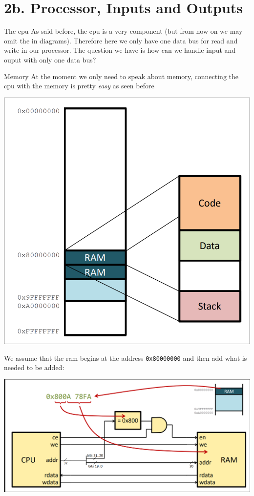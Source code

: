 \section{2b. Processor, Inputs and Outputs}

\begin{parag}{The cpu}
    As said before, the cpu is a very  component (but from now on we may omit the  in diagrams). Therefore here we only have one data bus for read and write in our processor. The question we have is how can we handle input and ouput with only one data bus?
\end{parag}
\begin{parag}{Memory}
    At the moment we only need to speak about memory, connecting the cpu with the memory is pretty \textit{easy} as seen before
	\begin{center}
	\includegraphics[scale=0.3]{screenshots/2025-10-22_3.png}
	\end{center}
	We assume that the ram begins at the  address \texttt{0x80000000} and then add what is needed to be added:
	\begin{center}
	\includegraphics[scale=0.25]{screenshots/2025-10-22_4.png}
	\end{center}
\end{parag}
